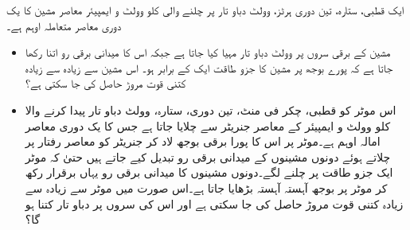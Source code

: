 ایک  قطبی، ستارہ، تین دوری  ہرٹز،  وولٹ دباو تار  پر چلنے والی  کلو وولٹ و ایمپیئر  معاصر مشین کا یک دوری  معاصر  متعاملہ   اوہم ہے۔
\begin{itemize}
\item
مشین کے برقی سروں پر  وولٹ دباو تار مہیا کیا جاتا ہے جبکہ اس کا میدانی برقی رو اتنا رکھا جاتا ہے کہ پورے بوجھ پر مشین کا جزو طاقت ایک کے برابر ہو۔ اس مشین سے زیادہ سے زیادہ کتنی قوت مروڑ حاصل کی جا سکتی ہے؟
\item
اس موٹر کو    قطبی،   چکر فی منٹ، تین دوری، ستارہ،   وولٹ دباو تار پیدا کرنے والا   کلو وولٹ و ایمپیئر کے معاصر جنریٹر سے چلایا جاتا ہے جس کا یک دوری معاصر امالہ  اوہم ہے۔موٹر پر اس کا پورا برقی بوجھ لاد  کر جنریٹر کو معاصر رفتار پر چلاتے ہوئے دونوں مشینوں کے میدانی برقی رو تبدیل کیے جاتے ہیں حتیٰ کہ موٹر ایک جزو طاقت پر چلنے لگے۔دونوں مشینوں کا میدانی برقی رو یہاں برقرار رکھ کر موٹر پر بوجھ آہستہ آہستہ بڑھایا جاتا ہے۔اس صورت میں موٹر سے زیادہ سے زیادہ کتنی قوت مروڑ  حاصل کی جا سکتی ہے اور اس کی سروں پر دباو تار کتنا ہو گا؟ 
\end{itemize}

